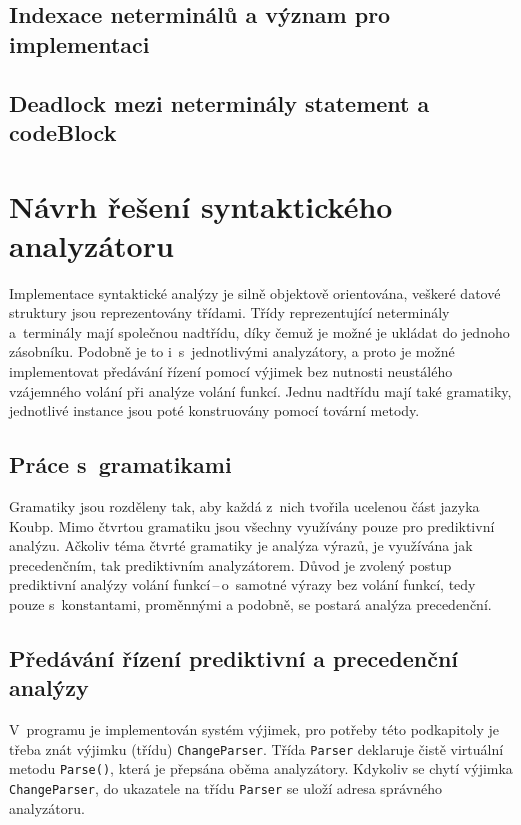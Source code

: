 \subsection*{Indexace neterminálů a význam pro implementaci} 

\subsection*{Deadlock mezi neterminály statement a codeBlock}

\section{Návrh řešení syntaktického analyzátoru}
Implementace syntaktické analýzy je silně objektově orientována, veškeré datové struktury jsou reprezentovány třídami.
Třídy reprezentující neterminály a~terminály mají společnou nadtřídu, díky čemuž je možné je ukládat do jednoho zásobníku.
Podobně je to i~s~jednotlivými analyzátory, a proto je možné implementovat předávání řízení pomocí výjimek bez nutnosti neustálého vzájemného volání při analýze volání funkcí.
Jednu nadtřídu mají také gramatiky, jednotlivé instance jsou poté konstruovány pomocí tovární metody.

\subsection*{Práce s~gramatikami}
Gramatiky jsou rozděleny tak, aby každá z~nich tvořila ucelenou část jazyka Koubp.
Mimo čtvrtou gramatiku jsou všechny využívány pouze pro prediktivní analýzu.
Ačkoliv téma čtvrté gramatiky je analýza výrazů, je využívána jak precedenčním, tak prediktivním analyzátorem.
Důvod je zvolený postup prediktivní analýzy volání funkcí\,--\,o~samotné výrazy bez volání funkcí, tedy pouze s~konstantami, proměnnými a podobně, se postará analýza precedenční.

\begin{figure}[h]
\caption{}
\label{fig_schema_analyzy}    
\end{figure}

\subsection*{Předávání řízení prediktivní a precedenční analýzy}
V~programu je implementován systém výjimek, pro potřeby této podkapitoly je třeba znát výjimku (třídu) \texttt{ChangeParser}.
Třída \texttt{Parser} deklaruje čistě virtuální metodu \texttt{Parse()}, která je přepsána oběma analyzátory.
Kdykoliv se chytí výjimka \texttt{ChangeParser}, do ukazatele na třídu \texttt{Parser} se uloží adresa správného analyzátoru.

